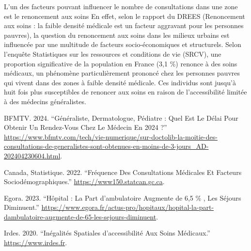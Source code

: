 \documentclass[
]{article}
\newlength{\cslhangindent}
\newenvironment{CSLReferences}[2] %
 {\begin{list}{}{%
  \setlength{\itemindent}{0pt}
  \setlength{\leftmargin}{0pt}
  \setlength{\parsep}{0pt}
  \ifodd #1
   \setlength{\leftmargin}{\cslhangindent}
   \setlength{\itemindent}{-1\cslhangindent}
  \fi
  \setlength{\itemsep}{#2\baselineskip}}}
 {\end{list}}
\begin{document}
L'un des facteurs pouvant influencer le nombre de consultations dans une
zone est le renoncement aux soins En effet, selon le rapport du DREES
(Renoncement aux soins : la faible densité médicale est un facteur
aggravant pour les personnes pauvres), la question du renoncement aux
soins dans les milieux urbains est influencée par une multitude de
facteurs socio-économiques et structurels. Selon l'enquête Statistiques
sur les ressources et conditions de vie (SRCV), une proportion
significative de la population en France (3,1 \%) renonce à des soins
médicaux, un phénomène particulièrement prononcé chez les personnes
pauvres qui vivent dans des zones à faible densité médicale. Ces
individus sont jusqu'à huit fois plus susceptibles de renoncer aux soins
en raison de l'accessibilité limitée à des médecins généralistes.

\label{refs}
\begin{CSLReferences}{1}{0}
BFMTV. 2024. {``Généraliste, Dermatologue, Pédiatre : Quel Est Le Délai
Pour Obtenir Un Rendez-Vous Chez Le Médecin En 2024 ?''}
\url{https://www.bfmtv.com/tech/vie-numerique/sur-doctolib-la-moitie-des-consultations-de-generalistes-sont-obtenues-en-moins-de-3-jours_AD-202404230604.html}.

Canada, Statistique. 2022. {``Fréquence Des Consultations Médicales Et
Facteurs Sociodémographiques.''} \url{https://www150.statcan.gc.ca}.

Egora. 2023. {``Hôpital : La Part d'ambulatoire Augmente de 6,5 \% , Les
Séjours Diminuent.''}
\url{https://www.egora.fr/actus-pro/hopitaux/hopital-la-part-dambulatoire-augmente-de-65-les-sejours-diminuent}.

Irdes. 2020. {``Inégalités Spatiales d'accessibilité Aux Soins
Médicaux.''} \url{https://www.irdes.fr}.

\end{CSLReferences}
\end{document}
